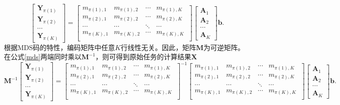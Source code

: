 \begin{equation}
	\begin{bmatrix}
	 \mathbf{Y}_{\pi(1)} \\
		 \mathbf{Y}_{\pi(2)}  \\
		\cdots   \\
		 \mathbf{Y}_{\pi(K)} 
	\end{bmatrix}=
	\begin{bmatrix}
		m_{\pi(1),1}& m_{\pi(1),2} &\cdots & m_{\pi(1),K}\\
		 m_{\pi(2),1}& m_{\pi(2),2}&\cdots & m_{\pi(2),K}\\
		\cdots & \cdots &\ddots &\cdots \\
		m_{\pi(K),1}& m_{\pi(K),2}&\cdots & m_{\pi(K),K}\	\\
	\end{bmatrix}
	\begin{bmatrix}
		\mathbf{A}_1 \\
		\mathbf{A}_2 \\
		\cdots \\
		\mathbf{A}_K
	\end{bmatrix}\mathbf{b}.\label{mds}
\end{equation}
根据MDS码的特性，编码矩阵中任意$K$行线性无关。因此，矩阵$\mathbf{M}$为可逆矩阵。在公式\eqref{mds}两端同时乘以$\mathbf{M}^{-1}$，则可得到原始任务的计算结果$\mathbf{X}$
\begin{equation}
		\mathbf{M}^{-1}	\begin{bmatrix}
		\mathbf{Y}_{\pi(1)} \\
		\mathbf{Y}_{\pi(2)}  \\
		\cdots   \\
		\mathbf{Y}_{\pi(K)}
	\end{bmatrix} =	\begin{bmatrix}
	m_{\pi(1),1}& m_{\pi(1),2} &\cdots & m_{\pi(1),K}\\
	m_{\pi(2),1}& m_{\pi(2),2}&\cdots & m_{\pi(2),K}\\
	\cdots & \cdots &\ddots &\cdots \\
	m_{\pi(K),1}& m_{\pi(K),2}&\cdots & m_{\pi(K),K}\	\\
	\end{bmatrix}^{-1}	\begin{bmatrix}
	m_{\pi(1),1}& m_{\pi(1),2} &\cdots & m_{\pi(1),K}\\
	m_{\pi(2),1}& m_{\pi(2),2}&\cdots & m_{\pi(2),K}\\
	\cdots & \cdots &\ddots &\cdots \\
	m_{\pi(K),1}& m_{\pi(K),2}&\cdots & m_{\pi(K),K}\	\\
	\end{bmatrix}	\begin{bmatrix}
	\mathbf{A}_1 \\
	\mathbf{A}_2 \\
	\cdots \\
	\mathbf{A}_K
	\end{bmatrix}\mathbf{b}.
\end{equation}

